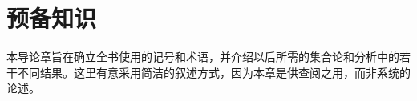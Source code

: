 \documentclass[../main.tex]{subfiles} %
\begin{document}
\chapter{预备知识}\label{chapter:ch00-prologue}
本导论章旨在确立全书使用的记号和术语，并介绍以后所需的集合论和分析中的若干不同结果。这里有意采用简洁的叙述方式，因为本章是供查阅之用，而非系统的论述。








\end{document}
